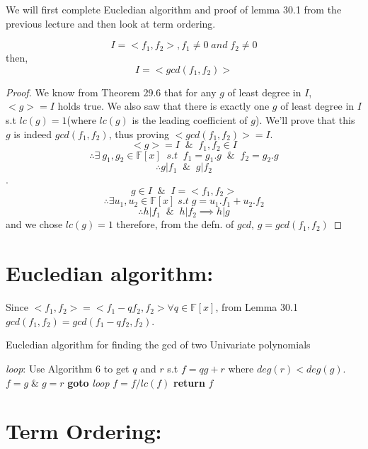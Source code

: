 We will first complete Eucledian algorithm and proof of lemma 30.1 from the previous lecture and then look at term ordering.
\begin{lemma}
$$I = <f_1, f_2>, f_1 \neq 0\;and\;f_2\neq 0$$
then,$$I=<gcd(f_1,f_2)>$$
\end{lemma}
\begin{proof}
We know from Theorem 29.6 that for any $g$ of least degree in $I$, $<g>=I$ holds true. We also saw that there is exactly one $g$ of least degree in $I$ s.t $lc(g)=1$(where $lc(g)$ is the leading coefficient of $g$). We'll prove that this $g$ is indeed $gcd(f_{1},f_{2})$, thus proving $<gcd(f_{1},f_{2})>=I$.
$$<g>=I\;\;\&\;\;f_{1},f_{2}\in I$$ 
$$\therefore \exists\ g_{1},g_{2}\in \mathbb{F}[x]\;\;s.t\;\;f_{1}=g_{1}.g\;\;\&\;\;f_{2}=g_{2}.g$$ 
$$\therefore g|f_{1}\;\;\&\;\;g|f_{2}$$.
$$g\in I\;\;\&\;\;I=<f_{1},f_{2}>$$
$$\therefore\exists u_{1},u_{2}\in \mathbb{F}[x]\;s.t\;g=u_{1}.f_{1}+u_{2}.f_{2}$$
$$\therefore h|f_{1}\;\;\&\;\;h|f_{2} \implies h|g$$
and we chose $lc(g)=1$
therefore, from the defn. of $gcd$, $g=gcd(f_{1},f_{2})$
\end{proof}
\section*{Eucledian algorithm:}
Since $<f_{1},f_{2}>=<f_{1}-qf_{2},f_{2}>\forall q\in \mathbb{F}[x]$, from Lemma 30.1  $gcd(f_{1},f_{2})=gcd(f_{1}-qf_{2},f_{2})$.
\begin{algorithm}
\caption{Eucledian algorithm for finding the gcd of two Univariate polynomials}\label{euclid}
\begin{algorithmic}[1]
\State \emph{loop}:
\State Use Algorithm 6 to get $q$ and $r$ s.t $f=qg+r$ where $deg(r)< deg(g)$.
\State $f=g\;\&\;g=r$
\State \textbf{goto} \emph{loop}
\EndIf
\State $f=f/lc(f)$
\State \textbf{return} $f$
\EndProcedure
\end{algorithmic}
\end{algorithm}
\section*{Term Ordering:}

